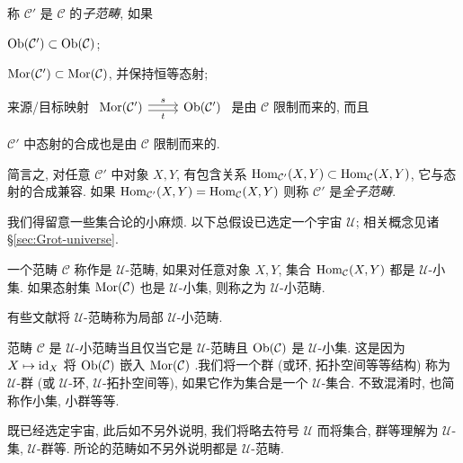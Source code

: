 \begin{definition}\label{def:subcategory}
	称 $\mathcal{C}'$ 是 $\mathcal{C}$ 的\emph{子范畴}, 如果
	\begin{compactenum}[(i)]
		\item $\operatorname{Ob}(\mathcal{C}') \subset \operatorname{Ob}(\mathcal{C})$;
		\item $\operatorname{Mor}(\mathcal{C}') \subset \operatorname{Mor}(\mathcal{C})$, 并保持恒等态射;
		\item 来源/目标映射 $\begin{tikzcd} \Mor(\mathcal{C}') \arrow[yshift=-0.5ex, r, "t"'] \arrow[yshift=0.5ex, r, "s"] & \Obj(\mathcal{C}') \end{tikzcd}$ 是由 $\mathcal{C}$ 限制而来的, 而且
		\item $\mathcal{C}'$ 中态射的合成也是由 $\mathcal{C}$ 限制而来的.
	\end{compactenum}

	简言之, 对任意 $\mathcal{C}'$ 中对象 $X, Y$, 有包含关系 $\operatorname{Hom}_{\mathcal{C}'}(X, Y) \subset \operatorname{Hom}_{\mathcal{C}}(X, Y)$, 它与态射的合成兼容. 如果 $\operatorname{Hom}_{\mathcal{C}'}(X, Y) = \operatorname{Hom}_{\mathcal{C}}(X, Y)$ 则称 $\mathcal{C}'$ 是\emph{全子范畴}.
\end{definition}

我们得留意一些集合论的小麻烦. 以下总假设已选定一个宇宙 $\mathcal{U}$; 相关概念见诸 \S\ref{sec:Grot-universe}.

\begin{definition}\label{def:U-cat}
  一个范畴 $\mathcal{C}$ 称作是 $\mathcal{U}$-范畴, 如果对任意对象 $X, Y$, 集合 $\operatorname{Hom}_{\mathcal{C}}(X,Y)$ 都是 $\mathcal{U}$-小集. 如果态射集 $\operatorname{Mor}(\mathcal{C})$ 也是 $\mathcal{U}$-小集, 则称之为 $\mathcal{U}$-小范畴.
\end{definition}
有些文献将 $\mathcal{U}$-范畴称为局部 $\mathcal{U}$-小范畴.

范畴 $\mathcal{C}$ 是 $\mathcal{U}$-小范畴当且仅当它是 $\mathcal{U}$-范畴且 $\operatorname{Ob}(\mathcal{C})$ 是 $\mathcal{U}$-小集. 这是因为 $X \mapsto \mathrm{id}_X$ 将 $\operatorname{Ob}(\mathcal{C})$ 嵌入 $\operatorname{Mor}(\mathcal{C})$ .我们将一个群 (或环, 拓扑空间等等结构) 称为 $\mathcal{U}$-群 (或 $\mathcal{U}$-环, $\mathcal{U}$-拓扑空间等), 如果它作为集合是一个 $\mathcal{U}$-集合. 不致混淆时, 也简称作小集, 小群等等.

\begin{convention}\label{con:U-small}
	既已经选定宇宙, 此后如不另外说明, 我们将略去符号 $\mathcal{U}$ 而将集合, 群等理解为 $\mathcal{U}$-集, $\mathcal{U}$-群等. 所论的范畴如不另外说明都是 $\mathcal{U}$-范畴.
\end{convention}


